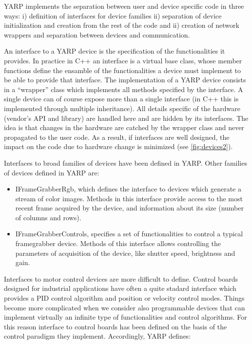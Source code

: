 YARP implements the separation between user and device specific code 
in three ways: i) definition of interfaces for device families ii) 
separation of device initialization and creation from the rest of the code and 
ii) creation of network wrappers and separation between devices and 
communication. 

An interface to a YARP device is the specification of the functionalities
it provides. In practice in C++ an interface is a virtual base class, whose 
member functions define the ensamble of the functionalities a device must 
implement to be able to provide that interface. The implementation of a 
YARP device consists in a ``wrapper'' class which implements all 
methods specified by the interface. A single device can of course expose 
more than a single interface (in C++ this is implemented through multiple
inheritance). All details specific of the hardware 
(vendor's API and library) are handled here and are hidden by its interfaces. 
The idea is that changes in the hardware are catched by the wrapper class and never 
propagated to the user code. As a result, if interfaces are well designed,
 the impact on the code due to hardware change is minimized (see 
\ref{fig:devices2}). 

Interfaces to broad families of devices have been defined in YARP. Other families 
of devices defined in YARP are:

\begin{itemize}

\item IFrameGrabberRgb, which defines the interface to devices which generate 
a stream of color images. Methods in this interface provide access to the most 
recent frame acquired by the device, and information about its size (number of 
columns and rows).

\item IFrameGrabberControls, specifies a set of functionalities to control a typical 
framegrabber device. Methods of this interface allows controlling the 
parameters of acquisition of the device, like shutter speed, brightness and gain.

\end{itemize}

Interfaces to motor control devices are more difficult to define. Control boards 
designed for industrial applications have often a quite stadard interface which 
provides a PID control algorithm and position or velocity control modes. Things 
become more complicated when we consider also programmable devices that can 
implement virtually an infinite type of functionalities and control algorithms. 
For this reason interface to control boards has been defined on the basis of 
the control paradigm they implement. Accordingly, YARP defines:

